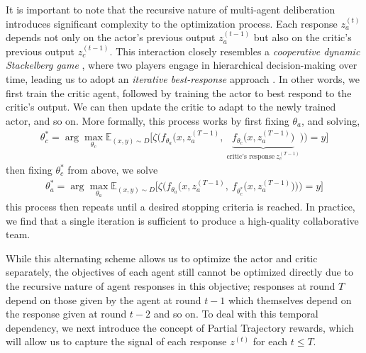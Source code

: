 It is important to note that the recursive nature of multi-agent deliberation introduces significant complexity to the optimization process. Each response \( z_a^{(t)} \) depends not only on the actor's previous output \( z_a^{(t-1)} \) but also on the critic's previous output \( z_c^{(t-1)} \). 
This interaction closely resembles a \emph{cooperative dynamic Stackelberg game} \citep{li2017review}, where two players engage in hierarchical decision-making over time, leading us to adopt an \emph{iterative best-response} approach \citep{fiez2019convergence}. 
In other words, we first train the critic agent, followed by training the actor to best respond to the critic's output.
We can then update the critic to adapt to the newly trained actor, and so on. 
More formally, this process works by first fixing $\theta_a$, and solving,
\begin{align}\label{eq:critic}
\theta_c^* = \arg\max_{\theta_c} \mathbb{E}_{(x, y)\sim D}\bigg[ \zeta\bigg( f_{\theta_a}\bigg(x, z_a^{(T-1)}, ~\underbrace{f_{\theta_c}\big(x, z_a^{(T-1)}\big)}_{\text{critic's response}~z_c^{(T-1)}} \bigg) \bigg) = y \bigg]
\end{align}
then fixing $\theta_c^*$ from above, we solve
\begin{align}\label{eq:actor}
\theta_a^* = \arg\max_{\theta_a}\mathbb{E}_{(x, y)\sim D}\bigg[ \zeta\bigg( f_{\theta_a}\bigg(x, z_a^{(T-1)}, ~f_{\theta_c^*}\big(x, z_a^{(T-1)}\big) \bigg) \bigg) = y \bigg]
\end{align}
this process then repeats until a desired stopping criteria is reached. 
In practice, we find that a single iteration is sufficient to produce a high-quality collaborative team.

While this alternating scheme allows us to optimize the actor and critic separately, the objectives of each agent still cannot be optimized directly due to the recursive nature of agent responses in this objective; responses at round $T$ depend on those given by the agent at round $t-1$ which themselves depend on the response given at round $t-2$ and so on.  
To deal with this temporal dependency, we next introduce the concept of Partial Trajectory rewards,
which will allow us to capture the signal of each response $z^{(t)}$ for each $t\leq T$.


